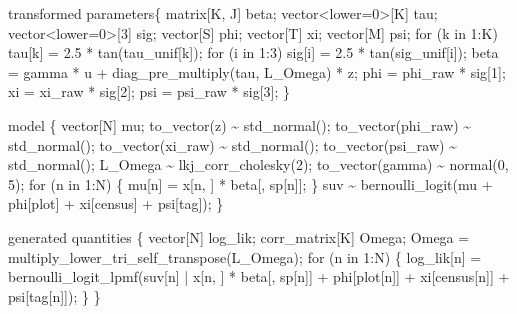 \documentclass[
  11pt,
  letterpaper,
  DIV=11,
  numbers=noendperiod]{scrartcl}
\newenvironment{Shaded}{}{}
\newcommand{\ControlFlowTok}[1]{\textcolor[rgb]{0.84,0.23,0.29}{#1}}
\newcommand{\DataTypeTok}[1]{\textcolor[rgb]{0.84,0.23,0.29}{#1}}
\newcommand{\DecValTok}[1]{\textcolor[rgb]{0.00,0.36,0.77}{#1}}
\newcommand{\FloatTok}[1]{\textcolor[rgb]{0.00,0.36,0.77}{#1}}
\newcommand{\KeywordTok}[1]{\textcolor[rgb]{0.84,0.23,0.29}{#1}}
\newcommand{\NormalTok}[1]{\textcolor[rgb]{0.14,0.16,0.18}{#1}}
\begin{document}
\begin{Shaded}
\begin{Highlighting}[]
\KeywordTok{transformed parameters}\NormalTok{\{}
  \DataTypeTok{matrix}\NormalTok{[K, J] beta;}
  \DataTypeTok{vector}\NormalTok{\textless{}}\KeywordTok{lower}\NormalTok{=}\DecValTok{0}\NormalTok{\textgreater{}[K] tau;}
  \DataTypeTok{vector}\NormalTok{\textless{}}\KeywordTok{lower}\NormalTok{=}\DecValTok{0}\NormalTok{\textgreater{}[}\DecValTok{3}\NormalTok{] sig;}
  \DataTypeTok{vector}\NormalTok{[S] phi;}
  \DataTypeTok{vector}\NormalTok{[T] xi;}
  \DataTypeTok{vector}\NormalTok{[M] psi;}
  \ControlFlowTok{for}\NormalTok{ (k }\ControlFlowTok{in} \DecValTok{1}\NormalTok{:K) tau[k] = }\FloatTok{2.5}\NormalTok{ * tan(tau\_unif[k]);}
  \ControlFlowTok{for}\NormalTok{ (i }\ControlFlowTok{in} \DecValTok{1}\NormalTok{:}\DecValTok{3}\NormalTok{) sig[i] = }\FloatTok{2.5}\NormalTok{ * tan(sig\_unif[i]);}
\NormalTok{  beta = gamma * u + diag\_pre\_multiply(tau, L\_Omega) * z;}
\NormalTok{  phi = phi\_raw * sig[}\DecValTok{1}\NormalTok{];}
\NormalTok{  xi = xi\_raw * sig[}\DecValTok{2}\NormalTok{];}
\NormalTok{  psi = psi\_raw * sig[}\DecValTok{3}\NormalTok{];}
\NormalTok{\}}

\KeywordTok{model}\NormalTok{ \{}
  \DataTypeTok{vector}\NormalTok{[N] mu;}
\NormalTok{  to\_vector(z) \textasciitilde{} std\_normal();}
\NormalTok{  to\_vector(phi\_raw) \textasciitilde{} std\_normal();}
\NormalTok{  to\_vector(xi\_raw) \textasciitilde{} std\_normal();}
\NormalTok{  to\_vector(psi\_raw) \textasciitilde{} std\_normal();}
\NormalTok{  L\_Omega \textasciitilde{} lkj\_corr\_cholesky(}\DecValTok{2}\NormalTok{);}
\NormalTok{  to\_vector(gamma) \textasciitilde{} normal(}\DecValTok{0}\NormalTok{, }\DecValTok{5}\NormalTok{);}
  \ControlFlowTok{for}\NormalTok{ (n }\ControlFlowTok{in} \DecValTok{1}\NormalTok{:N) \{}
\NormalTok{    mu[n] = x[n, ] * beta[, sp[n]];}
\NormalTok{  \}}
\NormalTok{  suv \textasciitilde{} bernoulli\_logit(mu + phi[plot] + xi[census] + psi[tag]);}
\NormalTok{\}}

\KeywordTok{generated quantities}\NormalTok{ \{}
  \DataTypeTok{vector}\NormalTok{[N] log\_lik;}
  \DataTypeTok{corr\_matrix}\NormalTok{[K] Omega;}
\NormalTok{  Omega = multiply\_lower\_tri\_self\_transpose(L\_Omega);}
  \ControlFlowTok{for}\NormalTok{ (n }\ControlFlowTok{in} \DecValTok{1}\NormalTok{:N) \{}
\NormalTok{    log\_lik[n] = bernoulli\_logit\_lpmf(suv[n] | x[n, ] * beta[, sp[n]] +}
\NormalTok{      phi[plot[n]] + xi[census[n]] + psi[tag[n]]);}
\NormalTok{  \}}
\NormalTok{\}}
\end{Highlighting}
\end{Shaded}
\end{document}
